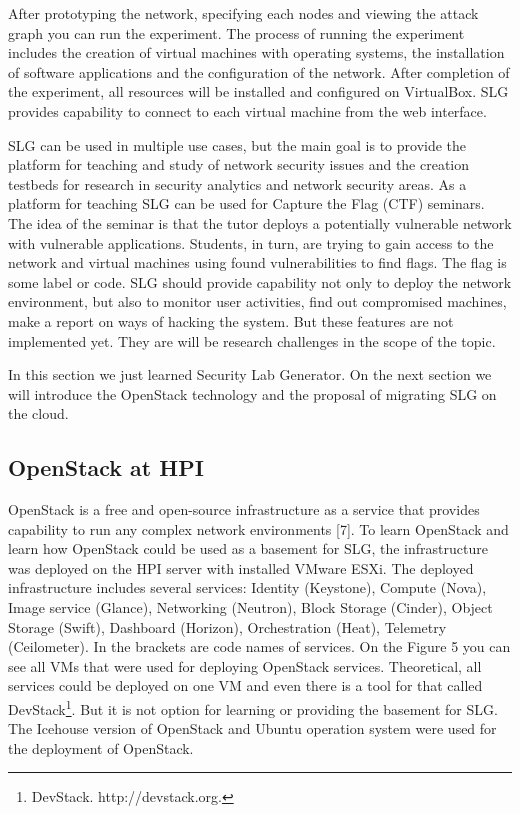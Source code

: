 After prototyping the network, specifying each nodes and viewing the attack graph you can run the experiment. The process of running the experiment includes the creation of virtual machines with operating systems, the installation of software applications and the configuration of the network. After completion of the experiment, all resources will be installed and configured on VirtualBox. SLG provides capability to connect to each virtual machine from the web interface. 


SLG can be used in multiple use cases, but the main goal is to provide the platform for teaching and study of network security issues and the creation testbeds for research in security analytics and network security areas. 
As a platform for teaching SLG can be used for Capture the Flag (CTF) seminars. The idea of the seminar is that the tutor deploys a potentially vulnerable network with vulnerable applications. Students, in turn, are trying to gain access to the network and virtual machines using found vulnerabilities to find flags. The flag is some label or code. SLG should provide capability not only to deploy the network environment, but also to monitor user activities, find out compromised machines, make a report on ways of hacking the system. But these features are not implemented yet.  They are will be research challenges in the scope of the topic.
  
  
In this section we just learned Security Lab Generator. On the next section we will introduce the OpenStack technology and the proposal of migrating SLG on the cloud.


 




\subsection{OpenStack at HPI}
OpenStack is a free and open-source infrastructure as a service that provides capability to run any complex network environments [7]. To learn OpenStack and learn how OpenStack could be used as a basement for SLG, the infrastructure was deployed on the HPI server with installed VMware ESXi. The deployed infrastructure includes several services: Identity (Keystone), Compute (Nova), Image service (Glance), Networking (Neutron), Block Storage (Cinder), Object Storage (Swift), Dashboard (Horizon), Orchestration (Heat), Telemetry (Ceilometer). In the brackets are code names of services. On the Figure 5 you can see all VMs that were used for deploying OpenStack services. Theoretical, all services could be deployed on one VM and even there is a tool for that called DevStack\footnote{DevStack. http://devstack.org.}. But it is not option for learning or providing the basement for SLG. The Icehouse version of OpenStack and Ubuntu operation system were used for the deployment of OpenStack.  

